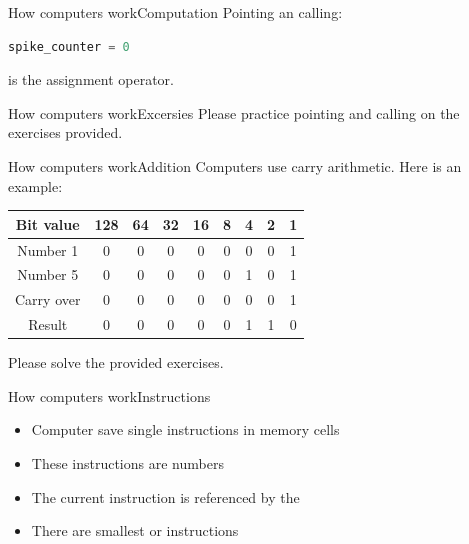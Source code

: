 \documentclass[aspectratio=169]{beamer}
\begin{document}
\begin{frame}[fragile]{How computers work}{Computation}
Pointing an calling:

\begin{lstlisting}[language=Python]
spike_counter = 0
\end{lstlisting}
\pause
{}
\pause

\vspace{2em}
\textquote{=} is the assignment operator.
\end{frame}

\begin{frame}{How computers work}{Excersies}
Please practice pointing and calling on the exercises provided.
\end{frame}

\begin{frame}{How computers work}{Addition}
Computers use carry arithmetic.
Here is an example:
\vspace{2em}

\begin{tabular}{ccccccccc}
Bit value  & 128 & 64 & 32 & 16 & 8 & 4 & 2 & 1 \\
\midrule
Number 1   & 0   &  0 &  0 &  0 & 0 & 0 & 0 & 1 \\
Number 5   & 0   &  0 &  0 &  0 & 0 & 1 & 0 & 1 \\
Carry over & 0   &  0 &  0 &  0 & 0 & 0 & 0 & 1 \\
\midrule
Result     & 0   &  0 &  0 &  0 & 0 & 1 & 1 & 0 \\
\end{tabular}

\pause

Please solve the provided exercises.

\end{frame}

\begin{frame}{How computers work}{Instructions}
\begin{itemize}
	\item Computer save single instructions in memory cells
	\item These instructions are numbers
	\item The current instruction is referenced by the 
	\item There are smallest or  instructions
\end{itemize}

\vspace{2em}

\end{frame}
\end{document}

